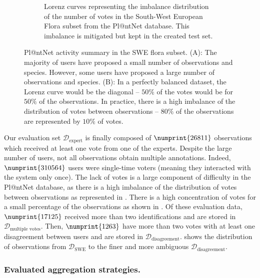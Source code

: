 \begin{figure}[htb]
\begin{subfigure}[t]{.40\textwidth}
        \caption{Lorenz curves representing the imbalance distribution of the number of votes in the South-West European Flora subset from the Pl@ntNet database. This imbalance is mitigated but kept in the created test set.}
        \label{fig:lorenz}
    \end{subfigure}
    \caption{Pl@ntNet activity summary in the SWE flora subset. (A): The majority of users have proposed a small number of observations and species. However, some users have proposed a large number of observations and species. (B): In a perfectly balanced dataset, the Lorenz curve would be the diagonal -- $50\%$ of the votes would be for $50\%$ of the observations. In practice, there is a high imbalance of the distribution of votes between observations -- $80\%$ of the observations are represented by $10\%$ of votes.}
    \label{fig:summary_subset}
\end{figure}

Our evaluation set $\mathcal{D}_{\text{expert}}$ is finally composed of $\numprint{26811}$ observations which received at least one vote from one of the experts.
Despite the large number of users, not all observations obtain multiple annotations.
Indeed, $\numprint{310564}$ users were single-time voters (meaning they interacted with the system only once).
The lack of votes is a large component of difficulty in the Pl@ntNet database, as there is a high imbalance of the distribution of votes between observations as represented in .
There is a high concentration of votes for a small percentage of the observations as shown in .
Of these evaluation data, $\numprint{17125}$ received more than two identifications and are stored in $\mathcal{D}_{\text{multiple votes}}$.
Then, $\numprint{1263}$ have more than two votes with at least one disagreement between users and are stored in $\mathcal{D}_{\text{disagreement}}$.
 shows the distribution of observations from $\mathcal{D}_{\mathrm{SWE}}$ to the finer and more ambiguous $\mathcal{D}_{\text{disagreement}}$.

\subsubsection*{Evaluated aggregation strategies.}

